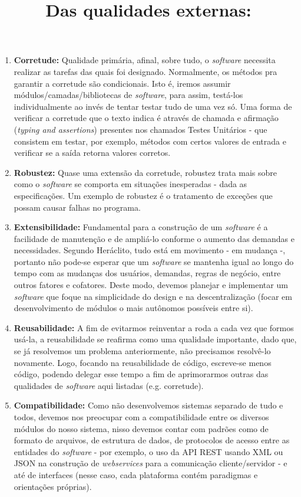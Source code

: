 \documentclass[12pt, a4paper]{article}
\begin{document}
    \title{\textbf{Das qualidades externas:}}
        \begin{enumerate}  
            \item \textbf{Corretude:} Qualidade primária, afinal, sobre tudo, o \textit{software} necessita realizar as tarefas das quais foi designado. Normalmente, os métodos pra garantir a corretude são condicionais. Isto é, iremos assumir módulos/camadas/bibliotecas de \textit{software}, para assim, testá-los individualmente ao invés de tentar testar tudo de uma vez só. Uma forma de verificar a corretude que o texto indica é através de chamada e afirmação (\textit{typing and assertions}) presentes nos chamados Testes Unitários - que consistem em testar, por exemplo, métodos com certos valores de entrada e verificar se a saída retorna valores corretos.
            
            \item \textbf{Robustez:} Quase uma extensão da corretude, robustez trata mais sobre como o 
            \textit{software} se comporta em situações inesperadas - dada as especificações. Um exemplo de robustez é o tratamento de exceções que possam causar falhas no programa.
            
            \item \textbf{Extensibilidade:} Fundamental para a construção de um \textit{software} é a facilidade de manutenção e de ampliá-lo conforme o aumento das demandas e necessidades. Segundo Heráclito, tudo está em movimento - em mudança -, portanto não pode-se esperar que um \textit{software} se mantenha igual ao longo do tempo com as mudanças dos usuários, demandas, regras de negócio, entre outros fatores e cofatores. Deste modo, devemos planejar e implementar um \textit{software} que foque na simplicidade do design e na descentralização (focar em desenvolvimento de módulos o mais autônomos possíveis entre si).  
            
            \item \textbf{Reusabilidade:} A fim de evitarmos reinventar a roda a cada vez que formos usá-la, a reusabilidade se reafirma como uma qualidade importante, dado que, se já resolvemos um problema anteriormente, não precisamos resolvê-lo novamente. Logo, focando na reusabilidade de código, escreve-se menos código, podendo delegar esse tempo a fim de aprimorarmos outras das qualidades de \textit{software} aqui listadas (e.g. corretude).
            
            \item \textbf{Compatibilidade:} Como não desenvolvemos sistemas separado de tudo e todos, devemos nos preocupar com a compatibilidade entre os diversos módulos do nosso sistema, nisso devemos contar com padrões como de formato de arquivos, de estrutura de dados, de protocolos de acesso entre as entidades do \textit{software} - por exemplo, o uso da API REST usando XML ou JSON na construção de \textit{webservices} para a comunicação cliente/servidor - e até de interfaces (nesse caso, cada plataforma contém paradigmas e orientações próprias).
            

\end{enumerate}
\end{document}
